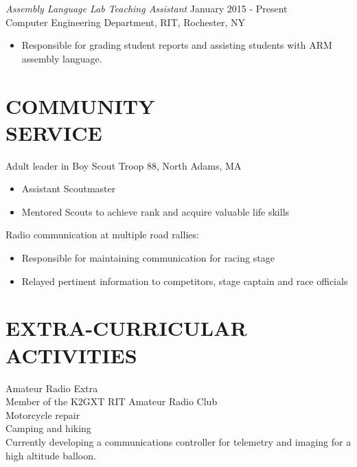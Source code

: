 \documentclass[line,margin]{res}
\begin{document}
\begin{resume}
	{\sl Assembly Language Lab Teaching Assistant } \hfill January 2015 - Present \\
		Computer Engineering Department, RIT, Rochester, NY
		\begin{itemize}  \itemsep -2pt %
			\item Responsible for grading student reports and assisting students with ARM assembly language. 
		\end{itemize} 
 
\section{COMMUNITY \\ SERVICE}  
	Adult leader in Boy Scout Troop 88, North Adams, MA
	\begin{itemize}  \itemsep -2pt %
		\item Assistant Scoutmaster
		\item Mentored Scouts to achieve rank and acquire valuable life skills%
	\end{itemize}
	Radio communication at multiple road rallies:
	\begin{itemize}  \itemsep -2pt %
		\item Responsible for maintaining communication for racing stage
		\item Relayed pertinent information to competitors, stage captain and race officials
	\end{itemize}

\section{EXTRA-CURRICULAR \\ ACTIVITIES}             
	Amateur Radio Extra\\
	Member of the K2GXT RIT Amateur Radio Club\\
	Motorcycle repair\\
	Camping and hiking\\
	Currently developing a communications controller for telemetry and imaging for a high altitude balloon. \\


\end{resume}
\end{document}
